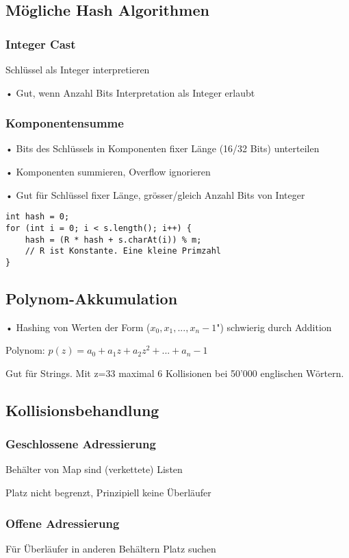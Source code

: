 \begin{multicols*}{5}
	\subsection{Mögliche Hash Algorithmen}
		\subsubsection{Integer Cast}
		Schlüssel als Integer interpretieren
		
		• Gut, wenn Anzahl Bits Interpretation als Integer erlaubt
	
		\subsubsection{Komponentensumme}
		• Bits des Schlüssels in Komponenten fixer Länge (16/32 Bits) unterteilen
		
		• Komponenten summieren, Overflow ignorieren
		
		• Gut für Schlüssel fixer Länge, grösser/gleich Anzahl Bits von Integer
		
		\begin{lstlisting}
int hash = 0;
for (int i = 0; i < s.length(); i++) {
	hash = (R * hash + s.charAt(i)) % m;
	// R ist Konstante. Eine kleine Primzahl
}
		\end{lstlisting}	
	
	\subsection{Polynom-Akkumulation}
	• Hashing von Werten der Form ($x_0, x_1 , ..., x_n-1$") schwierig durch Addition
	
	Polynom:
	$p(z) = a_0 + a_1z + a_2z^2 + ... + a_n-1$
		
	Gut für Strings. Mit z=33 maximal 6 Kollisionen bei 50'000 englischen Wörtern.
		
	\subsection{Kollisionsbehandlung}
		\subsubsection{Geschlossene Adressierung}
		Behälter von Map sind (verkettete) Listen
		
		Platz nicht begrenzt, Prinzipiell keine Überläufer
		
		\subsubsection{Offene Adressierung}
		Für Überläufer in anderen Behältern Platz suchen
		

\end{multicols*}
